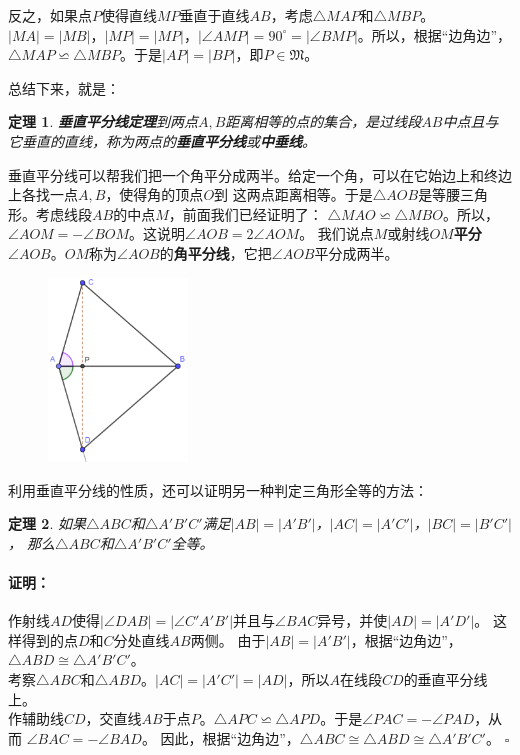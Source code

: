 \documentclass[12pt,UTF8]{ctexbook}
\newtheorem{tm}{定理}[section]
\newenvironment{proof2}{\paragraph{\textbf{证明：}}}{\hfill$\square$}
\begin{document}
反之，如果点$P$使得直线$MP$垂直于直线$AB$，考虑$\triangle MAP$和$\triangle MBP$。
$|MA| = |MB|$，$|MP| = |MP|$，$|\angle AMP| = 90^\circ = |\angle BMP|$。所以，根据“边角边”，
$\triangle MAP \backsimeq \triangle MBP$。于是$|AP| = |BP|$，即$P\in\mathfrak{M}$。

总结下来，就是：
\begin{tm}{\textbf{垂直平分线定理}}\label{tm:3-0-2}
    到两点$A,B$距离相等的点的集合，是过线段$AB$中点且与它垂直的直线，称为两点的\textbf{垂直平分线}或\textbf{中垂线}。
\end{tm}

垂直平分线可以帮我们把一个角平分成两半。给定一个角，可以在它始边上和终边上各找一点$A,B$，使得角的顶点$O$到
这两点距离相等。于是$\triangle AOB$是等腰三角形。考虑线段$AB$的中点$M$，前面我们已经证明了：
$\triangle MAO \backsimeq \triangle MBO$。所以，$\angle AOM = -\angle BOM$。这说明$\angle AOB = 2\angle AOM$。
我们说点$M$或射线$OM$\textbf{平分}$\angle AOB$。$OM$称为$\angle AOB$的\textbf{角平分线}，它把$\angle AOB$平分成两半。


\begin{figure} %
    \vspace{-15pt}
    \centering
    \includegraphics[width=0.33\textwidth]{三角形4.png}
\end{figure}

利用垂直平分线的性质，还可以证明另一种判定三角形全等的方法：
\begin{tm}\label{tm:3-0-4}
    如果$\triangle ABC$和$\triangle A'B'C'$满足$|AB| = |A'B'|$，$|AC| = |A'C'|$，$|BC| = |B'C'|$，
    那么$\triangle ABC$和$\triangle A'B'C'$全等。
\end{tm}
\begin{proof2}
    作射线$AD$使得$|\angle DAB| = |\angle C'A'B'|$并且与$\angle BAC$异号，并使$|AD| = |A'D'|$。
    这样得到的点$D$和$C$分处直线$AB$两侧。
    由于$|AB| = |A'B'|$，根据“边角边”，$\triangle ABD \cong \triangle A'B'C'$。\\
    考察$\triangle ABC$和$\triangle ABD$。$|AC| = |A'C'| = |AD|$，所以$A$在线段$CD$的垂直平分线上。\\
    作辅助线$CD$，交直线$AB$于点$P$。$\triangle APC \backsimeq \triangle APD$。于是$\angle PAC = -\angle PAD$，从而
    $\angle BAC = -\angle BAD$。
    因此，根据“边角边”，$\triangle ABC \cong \triangle ABD \cong \triangle A'B'C'$。
\end{proof2}
\end{document}
